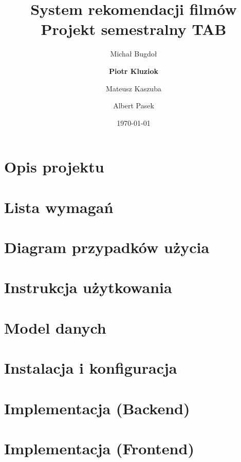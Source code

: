 \documentclass[12pt]{article}
\begin{document}
\title{
{System rekomendacji filmów}\\
{\large Projekt semestralny TAB}\\
}
\author{
	Michał Bugdoł
	\and
	\textbf{Piotr Kluziok}
	\and
	Mateusz Kaszuba
	\and
	Albert Pasek
}
\date{\today}

\maketitle
\newpage

\tableofcontents
\newpage

\section{Opis projektu}


\section{Lista wymagań}


\section{Diagram przypadków użycia}


\section{Instrukcja użytkowania}


\section{Model danych}


\section{Instalacja i konfiguracja}


\section{Implementacja (Backend)}


\section{Implementacja (Frontend)}

\end{document}
